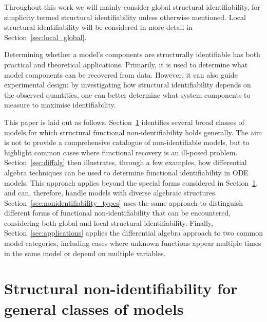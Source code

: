 \documentclass{article}
\theoremstyle{plain}
\theoremstyle{definition}
\begin{document}
\noindent
Throughout this work we will mainly consider global structural identifiability, for simplicity termed structural identifiability unless otherwise mentioned. Local structural identifiability will be considered in more detail in Section~\ref{sec:local_global}.

Determining whether a model's components are structurally identifiable has both practical and theoretical applications. Primarily, it is used to determine what model components can be recovered from data. However, it can also guide experimental design: by investigating how structural identifiability depends on the observed quantities, one can better determine what system components to measure to maximise identifiability.

This paper is laid out as follows. Section~\ref{sec:general_nonident} identifies several broad classes of models for which structural functional non-identifiability holds generally. The aim is not to provide a comprehensive catalogue of non-identifiable models, but to highlight common cases where functional recovery is an ill-posed problem. Section~\ref{sec:diffalg} then illustrates, through a few examples, how differential algebra techniques can be used to determine functional identifiability in ODE models. This approach applies beyond the special forms considered in Section~\ref{sec:general_nonident}, and can, therefore, handle models with diverse algebraic structures. Section~\ref{sec:nonidentifiability_types} uses the same approach to distinguish different forms of functional non-identifiability that can be encountered, considering both global and local structural identifiability. Finally, Section~\ref{sec:applications} applies the differential algebra approach to two common model categories, including cases where unknown functions appear multiple times in the same model or depend on multiple variables.


\section{Structural non-identifiability for general classes of models} \label{sec:general_nonident}
\end{document}
